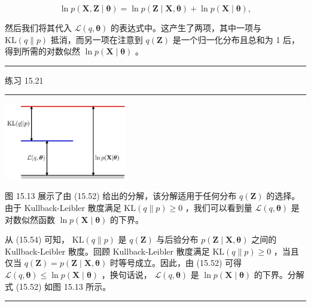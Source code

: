 \documentclass[10pt]{article}
\newcommand{\HRule}{\begin{center}\rule{0.9\linewidth}{0.2mm}\end{center}}
\begin{document}
\[
\ln p\left( {\mathbf{X},\mathbf{Z} \mid  \mathbf{\theta }}\right)  = \ln p\left( {\mathbf{Z} \mid  \mathbf{X},\mathbf{\theta }}\right)  + \ln p\left( {\mathbf{X} \mid  \mathbf{\theta }}\right) , \tag{15.55}
\]

然后我们将其代入 \(\mathcal{L}\left( {q,\mathbf{\theta }}\right)\) 的表达式中。这产生了两项，其中一项与 \(\mathrm{{KL}}\left( {q\parallel p}\right)\) 抵消，而另一项在注意到 \(q\left( \mathbf{Z}\right)\) 是一个归一化分布且总和为 1 后，得到所需的对数似然 \(\ln p\left( {\mathbf{X} \mid  \mathbf{\theta }}\right)\) 。

\HRule

练习 15.21

\HRule

\begin{center}
\includegraphics[max width=0.4\textwidth]{images/0194e279-9b28-703a-88f4-c3ac21e2010d_505_947_344_604_379_0.jpg}
\end{center}
\hspace*{3em} 

图 15.13 展示了由 (15.52) 给出的分解，该分解适用于任何分布 \(q\left( \mathbf{Z}\right)\) 的选择。由于 Kullback-Leibler 散度满足 \(\mathrm{{KL}}\left( {q\parallel p}\right)  \geq  0\) ，我们可以看到量 \(\mathcal{L}\left( {q,\mathbf{\theta }}\right)\) 是对数似然函数 \(\ln p\left( {\mathbf{X} \mid  \mathbf{\theta }}\right)\) 的下界。

从 (15.54) 可知， \(\mathrm{{KL}}\left( {q\parallel p}\right)\) 是 \(q\left( \mathbf{Z}\right)\) 与后验分布 \(p\left( {\mathbf{Z} \mid  \mathbf{X},\mathbf{\theta }}\right)\) 之间的 Kullback-Leibler 散度。回顾 Kullback-Leibler 散度满足 \(\mathrm{{KL}}\left( {q\parallel p}\right)  \geq  0\) ，当且仅当 \(q\left( \mathbf{Z}\right)  = p\left( {\mathbf{Z} \mid  \mathbf{X},\mathbf{\theta }}\right)\) 时等号成立。因此，由 (15.52) 可得 \(\mathcal{L}\left( {q,\mathbf{\theta }}\right)  \leq  \ln p\left( {\mathbf{X} \mid  \mathbf{\theta }}\right)\) ，换句话说， \(\mathcal{L}\left( {q,\mathbf{\theta }}\right)\) 是 \(\ln p\left( {\mathbf{X} \mid  \mathbf{\theta }}\right)\) 的下界。分解式 (15.52) 如图 15.13 所示。

\HRule
\end{document}
